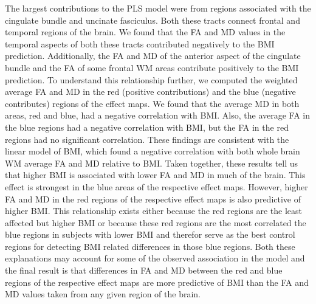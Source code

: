 The largest contributions to the PLS model were from regions associated with the cingulate bundle and uncinate fasciculus. Both these tracts connect frontal and temporal regions of the brain. We found that the FA and MD values in the temporal aspects of both these tracts contributed negatively to the BMI prediction. Additionally, the FA and MD of the anterior aspect of the cingulate bundle and the FA of some frontal WM areas contribute positively to the BMI prediction. To understand this relationship further, we computed the weighted average FA and MD in the red (positive contributions) and the blue (negative contributes) regions of the effect maps. We found that the average MD in both areas, red and blue, had a negative correlation with BMI. Also, the average FA in the blue regions had a negative correlation with BMI, but the FA in the red regions had no significant correlation. These findings are consistent with the linear model of BMI, which found a negative correlation with both whole brain WM average FA and MD relative to BMI. Taken together, these results tell us that higher BMI is associated with lower FA and MD in much of the brain. This effect is strongest in the blue areas of the respective effect maps. However, higher FA and MD in the red regions of the respective effect maps is also predictive of higher BMI. This relationship exists either because the red regions are the least affected but higher BMI or because these red regions are the most correlated the blue regions in subjects with lower BMI and therefor serve as the best control regions for detecting BMI related differences in those blue regions. Both these explanations may account for some of the observed association in the model and the final result is that differences in FA and MD between the red and blue regions of the respective effect maps are more predictive of BMI than the FA and MD values taken from any given region of the brain.

